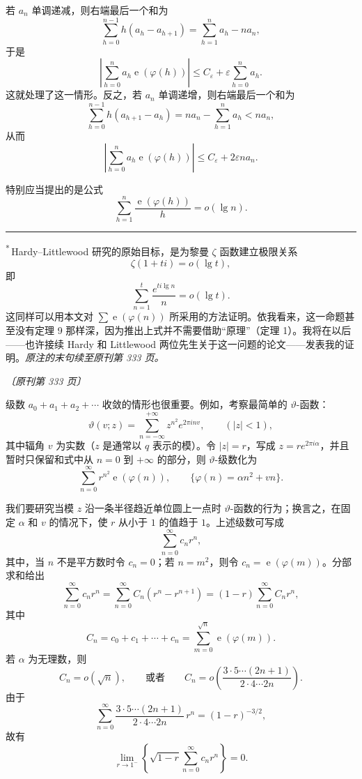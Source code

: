 \documentclass[UTF8,11pt,a4paper,fontset=none]{ctexart}
\theoremstyle{weylthm}
\newcommand{\e}{\operatorname{e}}
\newcommand{\origpage}[1]{%
  \par\vspace{0.7em}\noindent\hfill{\small\itshape〔原刊第 #1 页〕}\par\vspace{0.25em}}
\begin{document}
若 \(a_n\) 单调递减，则右端最后一个和为
\[
 \sum_{h=0}^{n-1}h(a_h-a_{h+1})
 =\sum_{h=1}^{n}a_h-na_n,
\]
于是
\[
 \left|\sum_{h=0}^{n}a_h\e(\varphi(h))\right|
 \leq C_{\varepsilon}+\varepsilon\sum_{h=0}^{n}a_h.
\]
这就处理了这一情形。反之，若 \(a_n\) 单调递增，则右端最后一个和为
\[
 \sum_{h=0}^{n-1}h(a_{h+1}-a_h)
 =na_n-\sum_{h=1}^{n}a_h<na_n,
\]
从而
\[
 \left|\sum_{h=0}^{n}a_h\e(\varphi(h))\right|
 \leq C_{\varepsilon}+2\varepsilon na_n.
\]

特别应当提出的是公式
\[
 \sum_{h=1}^{n}\frac{\e(\varphi(h))}{h}=o(\lg n).
\]
\par\medskip
\noindent\rule{0.28\textwidth}{0.4pt}\par
\begingroup\small
\noindent\textsuperscript{*}\,Hardy--Littlewood 研究的原始目标，是为黎曼 \(\zeta\) 函数建立极限关系
\[
 \zeta(1+ti)=o(\lg t),
\]
即
\[
 \sum_{n=1}^{t}\frac{e^{ti\lg n}}{n}=o(\lg t).
\]
这同样可以用本文对 \(\sum \e(\varphi(n))\) 所采用的方法证明。依我看来，这一命题甚至没有定理 9 那样深，因为推出上式并不需要借助“原理”（定理 1）。我将在以后——也许接续 Hardy 和 Littlewood 两位先生关于这一问题的论文——发表我的证明。\emph{原注的末句续至原刊第 333 页。}
\endgroup


\origpage{333}

级数 \(a_0+a_1+a_2+\cdots\) 收敛的情形也很重要。例如，考察最简单的 \(\vartheta\)-函数：
\[
  \vartheta(v;z)=\sum_{n=-\infty}^{+\infty}z^{n^2}e^{2\pi i n v},
  \qquad (|z|<1),
\]
其中辐角 \(v\) 为实数（\(z\) 是通常以 \(q\) 表示的模）。令 \(|z|=r\)，写成
\(z=re^{2\pi i\alpha}\)，并且暂时只保留和式中从 \(n=0\) 到 \(+\infty\) 的部分，则
\(\vartheta\)-级数化为
\[
  \sum_{n=0}^{\infty}r^{n^2}\e(\varphi(n)),
  \qquad \{\varphi(n)=\alpha n^2+vn\}.
\]

我们要研究当模 \(z\) 沿一条半径趋近单位圆上一点时 \(\vartheta\)-函数的行为；换言之，在固定 \(\alpha\) 和 \(v\) 的情况下，使 \(r\) 从小于 \(1\) 的值趋于 \(1\)。上述级数可写成
\[
  \sum_{n=0}^{\infty}c_n r^n,
\]
其中，当 \(n\) 不是平方数时令 \(c_n=0\)；若 \(n=m^2\)，则令
\(c_n=\e(\varphi(m))\)。分部求和给出
\[
  \sum_{n=0}^{\infty}c_n r^n
  =\sum_{n=0}^{\infty}C_n(r^n-r^{n+1})
  =(1-r)\sum_{n=0}^{\infty}C_n r^n,
\]
其中
\[
  C_n=c_0+c_1+\cdots+c_n
  =\sum_{m=0}^{\sqrt n}\e(\varphi(m)).
\]
若 \(\alpha\) 为无理数，则
\[
  C_n=o(\sqrt n),
  \qquad\text{或者}\qquad
  C_n=o\!\left(\frac{3\cdot5\cdots(2n+1)}{2\cdot4\cdots 2n}\right).
\]
由于
\[
  \sum_{n=0}^{\infty}
  \frac{3\cdot5\cdots(2n+1)}{2\cdot4\cdots 2n}\,r^n
  =(1-r)^{-3/2},
\]
故有
\[
  \lim_{r\to1^-}\left\{
    \sqrt{1-r}\sum_{n=0}^{\infty}c_n r^n
  \right\}=0.
\]
\end{document}
